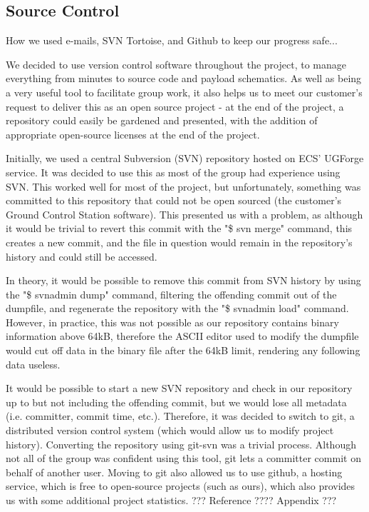 \subsection{Source Control}
How we used e-mails, SVN Tortoise, and Github to keep our progress safe...

We decided to use version control software throughout the project, to manage 
everything from minutes to source code and payload schematics. As well as 
being a very useful tool to facilitate group work, it also helps us to meet 
our customer's request to deliver this as an open source project - at the end 
of the project, a repository could easily be gardened and presented, with the 
addition of appropriate open-source licenses at the end of the project.

Initially, we used a central Subversion (SVN) repository hosted on ECS' 
UGForge service. It was decided to use this as most of the group had 
experience using SVN. This worked well for most of the project, but 
unfortunately, something was committed to this repository that could not be 
open sourced (the customer's Ground Control Station software). This presented 
us with a problem, as although it would be trivial to revert this commit with 
the "\$ svn merge" command, this creates a new commit, and the file in 
question would remain in the repository's history and could still be accessed.

In theory, it would be possible to remove this commit from SVN history by 
using the "\$ svnadmin dump" command, filtering the offending commit out of 
the dumpfile, and regenerate the repository with the "\$ svnadmin load" 
command. However, in practice, this was not possible as our repository 
contains binary information above 64kB, therefore the ASCII editor used to 
modify the dumpfile would cut off data in the binary file after the 64kB 
limit, rendering any following data useless.

It would be possible to start a new SVN repository and check in our 
repository up to but not including the offending commit, but we would lose 
all metadata (i.e. committer, commit time, etc.). Therefore, it was decided to 
switch to git, a distributed version control system (which would allow us to 
modify project history). Converting the repository using git-svn was a trivial 
process. Although not all of the group was confident using this tool, git 
lets a committer commit on behalf of another user. Moving to git also 
allowed us to use github, a hosting service, which is free to open-source 
projects (such as ours), which also provides us with some additional 
project statistics. ??? Reference ???? Appendix ???
